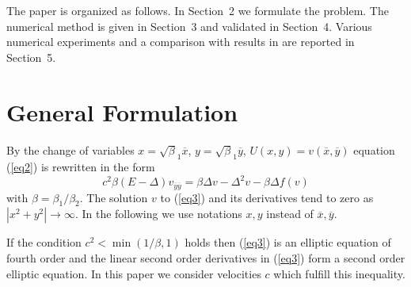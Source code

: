 \documentclass[preprint]{elsarticle}
\newcommand{\rf}[1]{(\ref{#1})}
\begin{document}
The paper is organized as follows. In Section~2 we formulate the  problem. The numerical method is given in Section~3 and validated in Section~4.  Various numerical  experiments and a comparison with  results in \cite{Ch2011,Ch2012} are reported in Section~5.

\section{General Formulation}

By the change of variables $x=\sqrt\beta_1 { \overline x}$, $y=\sqrt\beta_1 { \overline y}$, $U(x,y)= v({ \overline x},{ \overline y} )$ 
 equation \rf{eq2} is rewritten in the form 
 \begin{equation}\label{eq3}
c^2 \beta (E- \Delta) v_{{\overline y}{\overline y}} = \beta \Delta v - \Delta^2 v - \beta \Delta f(v)
\end{equation}
with   $\beta = \beta_1 / \beta_2$.
The solution $v$ to \rf{eq3} and its derivatives  tend to zero as $|x^2 +y^2|\rightarrow \infty$.
In the following we use notations $x,y$ instead of ${\overline x},{\overline y}$.

If the condition $c^2 < \min (1/ \beta,1)$ holds then  \rf{eq3} is an elliptic equation of fourth order and the linear second order derivatives in \rf{eq3} form  a second order elliptic equation. In this paper we consider velocities $c$ which fulfill this inequality.
\end{document}
